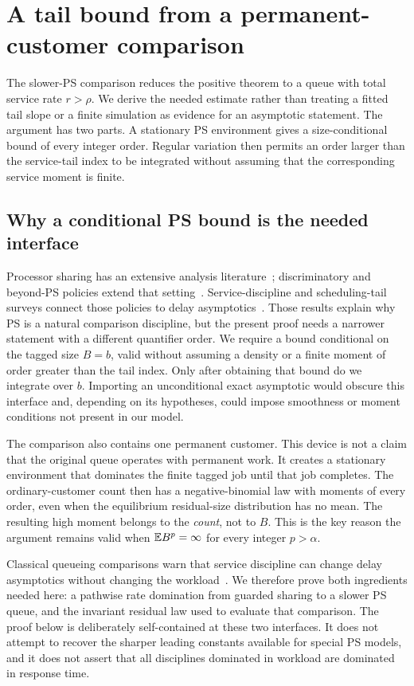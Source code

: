 \section{A tail bound from a permanent-customer comparison}\label{sec:tail}
The slower-PS comparison reduces the positive theorem to a queue with total service rate $r>\rho$. We derive the needed estimate rather than treating a fitted tail slope or a finite simulation as evidence for an asymptotic statement. The argument has two parts. A stationary PS environment gives a size-conditional bound of every integer order. Regular variation then permits an order larger than the service-tail index to be integrated without assuming that the corresponding service moment is finite.

\subsection{Why a conditional PS bound is the needed interface}\label{sec:ps-interface}
Processor sharing has an extensive analysis literature~\cite{yashkov1987}; discriminatory and beyond-PS policies extend that setting~\cite{altman2006,aalto2007}. Service-discipline and scheduling-tail surveys connect those policies to delay asymptotics~\cite{borst2003,boxmazwart2007}. Those results explain why PS is a natural comparison discipline, but the present proof needs a narrower statement with a different quantifier order. We require a bound conditional on the tagged size $B=b$, valid without assuming a density or a finite moment of order greater than the tail index. Only after obtaining that bound do we integrate over $b$. Importing an unconditional exact asymptotic would obscure this interface and, depending on its hypotheses, could impose smoothness or moment conditions not present in our model.

The comparison also contains one permanent customer.  This device is not a claim that the original queue operates with permanent work.  It creates a stationary environment that dominates the finite tagged job until that job completes.  The ordinary-customer count then has a negative-binomial law with moments of every order, even when the equilibrium residual-size distribution has no mean.  The resulting high moment belongs to the \emph{count}, not to $B$.  This is the key reason the argument remains valid when $\mathbb E B^p=\infty$ for every integer $p>\alpha$.

Classical queueing comparisons warn that service discipline can change delay asymptotics without changing the workload~\cite{shanthikumar1987,borst2003}.  We therefore prove both ingredients needed here: a pathwise rate domination from guarded sharing to a slower PS queue, and the invariant residual law used to evaluate that comparison.  The proof below is deliberately self-contained at these two interfaces.  It does not attempt to recover the sharper leading constants available for special PS models, and it does not assert that all disciplines dominated in workload are dominated in response time.

